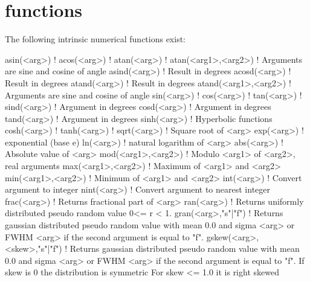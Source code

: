 \section{functions}
\par
The following intrinsic numerical functions exist: 
\par
\begin{MacVerbatim}
asin(<arg>)                     !
acos(<arg>)                     !
atan(<arg>)                     !
atan(<arg1>,<arg2>)             ! Arguments are sine and cosine of angle
asind(<arg>)                    ! Result in degrees
acosd(<arg>)                    ! Result in degrees
atand(<arg>)                    ! Result in degrees
atand(<arg1>,<arg2>)            ! Arguments are sine and cosine of angle
sin(<arg>)                      !
cos(<arg>)                      !
tan(<arg>)                      !
sind(<arg>)                     ! Argument in degrees
cosd(<arg>)                     ! Argument in degrees
tand(<arg>)                     ! Argument in degrees
sinh(<arg>)                     ! Hyperbolic functions
cosh(<arg>)                     !
tanh(<arg>)                     !
sqrt(<arg>)                     ! Square root of <arg>
exp(<arg>)                      ! exponential (base e)
ln(<arg>)                       ! natural logarithm of <arg>
abs(<arg>)                      ! Absolute value of <arg>
mod(<arg1>,<arg2>)              ! Modulo <arg1> of <arg2>, real arguments
max(<arg1>,<arg2>)              ! Maximum of <arg1> and <arg2>
min(<arg1>,<arg2>)              ! Minimum of <arg1> and <arg2>
int(<arg>)                      ! Convert argument to integer
nint(<arg>)                     ! Convert argument to nearest integer
frac(<arg>)                     ! Returns fractional part of <arg>
ran(<arg>)                      ! Returns uniformly distributed pseudo
                                  random value 0<= r < 1.
gran(<arg>{,"s"|"f"})           ! Returns gaussian distributed pseudo
                                  random value with mean 0.0 and
                                  sigma <arg> or FWHM <arg> if the
                                  second argument is equal to "f".
gskew(<arg>,<skew>{,"s"|"f"})   ! Returns gaussian distributed pseudo
                                  random value with mean 0.0 and
                                  sigma <arg> or FWHM <arg> if the
                                  second argument is equal to "f".
                                  If skew is 0 the distribution is symmetric
                                  For skew <=  1.0 it is right skewed

\end{MacVerbatim}
